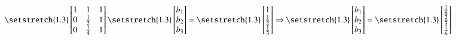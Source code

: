 \documentclass[10pt,a4paper]{article}
\begin{document}
		\begin{align*}
			\begingroup %
			\setstretch{1.3}
			\begin{bmatrix}
				1 & 1 & 1 \\
				0 & \frac{1}{2} & 1 \\
				0 & \frac{1}{4} & 1 \\
			\end{bmatrix}
			\endgroup
			\begingroup %
			\setstretch{1.3}
				\begin{bmatrix}
					b_1 \\
					b_2 \\
					b_3
				\end{bmatrix}
				\endgroup
				=
				\begingroup %
				\setstretch{1.3}
				\begin{bmatrix}
					1 \\
					\frac{1}{2} \\
					\frac{1}{3} \\
				\end{bmatrix}
				\endgroup \Rightarrow \begingroup %
				\setstretch{1.3}\begin{bmatrix}
				b_1 \\
				b_2 \\
				b_3
				\end{bmatrix}\endgroup =
				\begingroup %
				\setstretch{1.3}
				\begin{bmatrix}
				\frac{1}{6} \\
				\frac{2}{3} \\
				\frac{1}{6}
				\end{bmatrix}\endgroup
		\end{align*}
\end{document}
